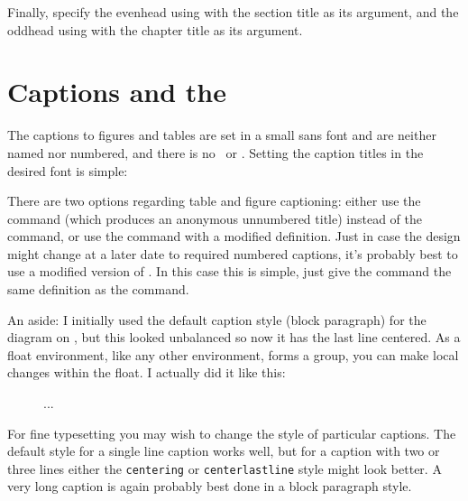     Finally, specify the evenhead using \cmd{\bringpicl} with the section
title as its argument, and the oddhead using \cmd{\bringpicr} with the
chapter title as its argument.
\begin{lcode}
\end{lcode}


\section{Captions and the \prtoc}

    The captions to figures and tables are set 
in a small sans font and are neither named nor numbered, and there is no 
\lof\ or \lot. Setting the caption titles in the desired font is simple:
\begin{lcode}
\captiontitlefont{\small\sffamily}
\end{lcode}

    There are two options regarding table and figure
captioning: either
use the \cmd{\legend} command (which produces an anonymous unnumbered title)
instead of the \cmd{\caption} command, or
use the \cmd{\caption} command with a modified definition. Just in case
the design might change at a later date to required numbered captions, 
it's probably best to use 
a modified version of \cmd{\caption}. In this case this is simple, just give
the \cmd{\caption} command the same definition as the \cmd{\legend} command.
\begin{lcode}
\let\caption\legend
\end{lcode}

    An aside: I initially used the default caption style (block paragraph) for
the diagram on , but this looked unbalanced so now it
has the last line centered. As a float environment, 
like any other environment, forms a group, you can make local changes within 
the float. I actually did it like this:
\begin{lcode}
\begin{figure}
\captiontitlefont{\small\sffamily}
\captionstyle{\centerlastline}
...
 \label{...}
\end{figure} 
\end{lcode}
For fine typesetting you may wish to change the style of particular captions.
The default style for a single line caption works well, but for a caption with
two or three lines either the \texttt{centering} or \texttt{centerlastline}
style might look better. A very long caption is again probably best done in 
a block paragraph style.

